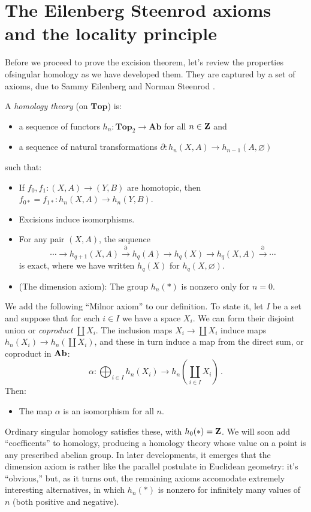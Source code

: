\section{The Eilenberg Steenrod axioms and the locality principle}


Before we proceed to prove the excision theorem, let's review the properties ofsingular homology as we have developed them. They are captured by a set of axioms, due to Sammy Eilenberg and Norman Steenrod \cite{eilenberg-steenrod}. 
\begin{definition}
A {\em homology theory} (on $\mathbf{Top}$) is:
\begin{itemize}
\item a sequence of functors $h_n:\mathbf{Top}_2\to\mathbf{Ab}$ for all $n\in\mathbf Z$ and
\item a sequence of natural transformations $\partial:h_n(X,A)\to h_{n-1}(A,\varnothing)$
\end{itemize}
such that:
\begin{itemize}
\item If $f_0,f_1:(X,A)\to (Y,B)$ are homotopic, then $f_{0\ast}=f_{1\ast}:h_n(X,A)\to h_n(Y,B)$.
\item Excisions induce isomorphisms.
\item For any pair $(X,A)$, the sequence 
\begin{equation*}
\cdots\to h_{q+1}(X,A)\xrightarrow{\partial}h_q(A)\to h_q(X)\to h_q(X,A)\xrightarrow{\partial}\cdots
\end{equation*}
is exact, where we have written $h_q(X)$ for $h_q(X,\varnothing)$.
\item (The dimension axiom): The group $h_n(\ast)$ is nonzero only for $n=0$. 
\end{itemize}
\end{definition}
We add the following ``Milnor axiom'' \cite{milnor}
to our definition. To state it,
let $I$ be a set and suppose that for each $i\in I$ we have a space $X_i$. We can form their disjoint union or {\em coproduct} $\coprod X_i$. The inclusion maps $X_i\to\coprod X_i$ induce maps $h_n(X_i)\to h_n(\coprod X_i)$, and these in turn induce a map from the direct sum, or coproduct in $\mathbf{Ab}$:
\[
\alpha:\bigoplus_{i\in I} h_n(X_i)\to h_n\left(\coprod_{i\in I} X_i\right)\,.
\]
Then:
\begin{itemize}
\item The map $\alpha$ is an isomorphism for all $n$.
\end{itemize}

Ordinary singular homology satisfies these, with $h_0(\ast)=\mathbf Z$. We will soon add ``coefficents'' to homology, producing a homology theory whose value on a point is any prescribed abelian group. In later developments, it 
emerges that the dimension axiom is rather like the parallel postulate
in Euclidean geometry: it's ``obvious,'' but, as it turns out, the remaining
axioms accomodate extremely interesting alternatives, in which
$h_n(*)$ is nonzero for infinitely many values of $n$ (both positive and negative). 

